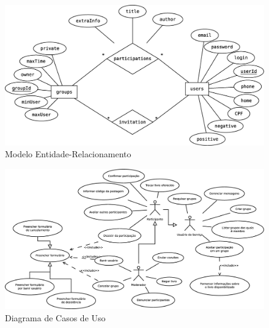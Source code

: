 \documentclass[a4paper]{article}
\begin{document}
 \begin{figure}
  \includegraphics[angle=90,totalheight=\textheight]{modeloER.eps}
  \caption{Modelo Entidade-Relacionamento}
 \end{figure}
 
 \begin{figure}
  \includegraphics[angle=90,totalheight=\textheight]{casosDeUso.eps}
  \caption{Diagrama de Casos de Uso}
 \end{figure}

 
\end{document}
